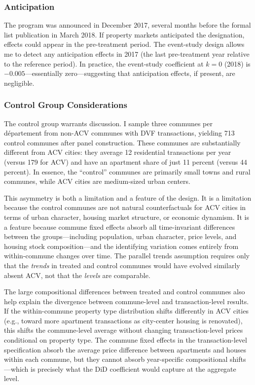 \documentclass[12pt]{article}
\begin{document}
\subsubsection{Anticipation}

The program was announced in December 2017, several months before the formal list publication in March 2018. If property markets anticipated the designation, effects could appear in the pre-treatment period. The event-study design allows me to detect any anticipation effects in 2017 (the last pre-treatment year relative to the reference period). In practice, the event-study coefficient at $k = 0$ (2018) is $-0.005$---essentially zero---suggesting that anticipation effects, if present, are negligible.

\subsubsection{Control Group Considerations}

The control group warrants discussion. I sample three communes per d\'{e}partement from non-ACV communes with DVF transactions, yielding 713 control communes after panel construction. These communes are substantially different from ACV cities: they average 12 residential transactions per year (versus 179 for ACV) and have an apartment share of just 11 percent (versus 44 percent). In essence, the ``control'' communes are primarily small towns and rural communes, while ACV cities are medium-sized urban centers.

This asymmetry is both a limitation and a feature of the design. It is a limitation because the control communes are not natural counterfactuals for ACV cities in terms of urban character, housing market structure, or economic dynamism. It is a feature because commune fixed effects absorb all time-invariant differences between the groups---including population, urban character, price levels, and housing stock composition---and the identifying variation comes entirely from within-commune changes over time. The parallel trends assumption requires only that the \textit{trends} in treated and control communes would have evolved similarly absent ACV, not that the \textit{levels} are comparable.

The large compositional differences between treated and control communes also help explain the divergence between commune-level and transaction-level results. If the within-commune property type distribution shifts differently in ACV cities (e.g., toward more apartment transactions as city-center housing is renovated), this shifts the commune-level average without changing transaction-level prices conditional on property type. The commune fixed effects in the transaction-level specification absorb the average price difference between apartments and houses within each commune, but they cannot absorb year-specific compositional shifts---which is precisely what the DiD coefficient would capture at the aggregate level.
\end{document}
